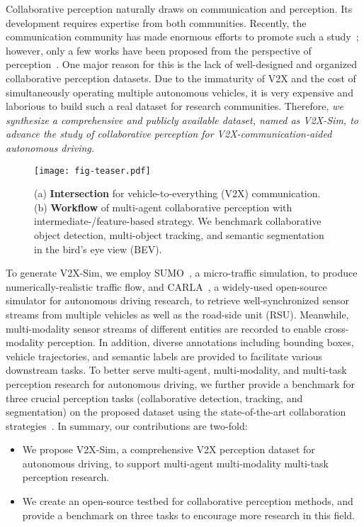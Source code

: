 Collaborative perception naturally draws on communication and perception. Its development requires expertise from both communities. Recently, the communication community has made enormous efforts to promote such a study~\cite{muhammad2018survey,hasan2020securing,mannoni2019comparison}; however, only a few works have been proposed from the perspective of perception~\cite{Chen2019CooperCP,Wang2020V2VNetVC, Li_2021_NeurIPS,yuan2021comap,yuan2022keypoints}.
One major reason for this is the lack of well-designed and organized collaborative perception datasets. Due to the immaturity of V2X and the cost of simultaneously operating multiple autonomous vehicles, it is very expensive and laborious to build such a real dataset for research communities. Therefore, \textit{we synthesize a comprehensive and publicly available dataset, named as V2X-Sim, to advance the study of collaborative perception for V2X-communication-aided autonomous driving.}

 \begin{figure}[t]
	\centering	\texttt{[image: fig-teaser.pdf]}%
	\caption{ (a) \textbf{Intersection} for vehicle-to-everything (V2X) communication. (b) \textbf{Workflow} of multi-agent collaborative perception with intermediate-/feature-based strategy. We benchmark collaborative object detection, multi-object tracking, and semantic segmentation in the bird's eye view (BEV).}
	\label{fig:1}
	\vspace{-0.5cm}
\end{figure}

To generate V2X-Sim, we employ SUMO~\cite{krajzewicz2012recent}, a micro-traffic simulation, to produce numerically-realistic traffic flow, and CARLA~\cite{Dosovitskiy17}, a widely-used open-source simulator for autonomous driving research, to retrieve well-synchronized sensor streams from multiple vehicles as well as the road-side unit (RSU). Meanwhile, multi-modality sensor streams of different entities are recorded to enable cross-modality perception. In addition, diverse annotations including bounding boxes, vehicle trajectories, and semantic labels are provided to facilitate various downstream tasks. To better serve multi-agent, multi-modality, and multi-task perception research for autonomous driving, we further provide a benchmark for three crucial perception tasks (collaborative detection, tracking, and segmentation) on the proposed dataset using the state-of-the-art collaboration strategies~\cite{Li_2021_NeurIPS,Wang2020V2VNetVC,Liu2020When2comMP,Liu2020Who2comCP}. In summary, our contributions are two-fold: 
\begin{itemize}
     \item We propose V2X-Sim, a comprehensive V2X perception dataset for autonomous driving, to support multi-agent multi-modality multi-task perception research.
    \item We create an open-source testbed for collaborative perception methods, and provide a benchmark on three tasks to encourage more research in this field. 
\end{itemize}

